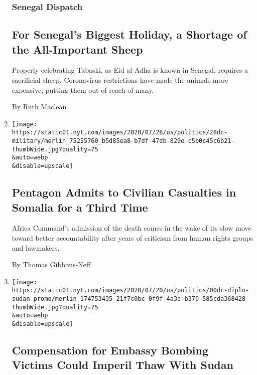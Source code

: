 \begin{enumerate}
  \hypertarget{senegal-dispatch}{%
  \subsubsection{Senegal Dispatch}\label{senegal-dispatch}}

  \hypertarget{for-senegals-biggest-holiday-a-shortage-of-the-all-important-sheep}{%
  \subsection{For Senegal's Biggest Holiday, a Shortage of the
  All-Important
  Sheep}\label{for-senegals-biggest-holiday-a-shortage-of-the-all-important-sheep}}

  Properly celebrating Tabaski, as Eid al-Adha is known in Senegal,
  requires a sacrificial sheep. Coronavirus restrictions have made the
  animals more expensive, putting them out of reach of many.

  By Ruth Maclean
\item
  \href{/2020/07/28/world/africa/pentagon-somalia-civilian-casualties.html}{}

  \texttt{[image: https://static01.nyt.com/images/2020/07/28/us/politics/28dc-military/merlin\_75255760\_b5d85ea8-b7df-47db-829e-c5b0c45c6b21-thumbWide.jpg?quality=75\\\&auto=webp\\\&disable=upscale]}

  \hypertarget{pentagon-admits-to-civilian-casualties-in-somalia-for-a-third-time}{%
  \subsection{Pentagon Admits to Civilian Casualties in Somalia for a
  Third
  Time}\label{pentagon-admits-to-civilian-casualties-in-somalia-for-a-third-time}}

  Africa Command's admission of the death comes in the wake of its slow
  move toward better accountability after years of criticism from human
  rights groups and lawmakers.

  By Thomas Gibbons-Neff
\item
  \href{/2020/07/25/us/politics/sudan-compensation-embassy-bombings.html}{}

  \texttt{[image: https://static01.nyt.com/images/2020/07/20/us/politics/00dc-diplo-sudan-promo/merlin\_174753435\_21f7c0bc-0f9f-4a3e-b370-585cda368428-thumbWide.jpg?quality=75\\\&auto=webp\\\&disable=upscale]}

  \hypertarget{compensation-for-embassy-bombing-victims-could-imperil-thaw-with-sudan}{%
  \subsection{Compensation for Embassy Bombing Victims Could Imperil
  Thaw With
  Sudan}\label{compensation-for-embassy-bombing-victims-could-imperil-thaw-with-sudan}}


\end{enumerate}
